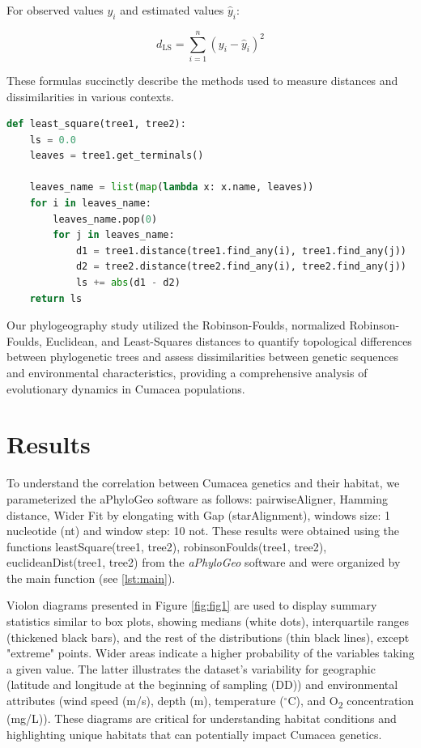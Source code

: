 For observed values $y_i$ and estimated values $\hat{y}_i$:

\begin{equation}\label{eq:ls}
    d_{\text{LS}} = \sum_{i=1}^{n} (y_i - \hat{y}_i)^2
\end{equation}

These formulas succinctly describe the methods used to measure distances and dissimilarities in various contexts.

\begin{lstlisting}[label=lst:LeastSquare, language=Python, caption=Python script for calculating the Least-Square distance using the ete3 package in the aPhyloGeo package]
def least_square(tree1, tree2):
    ls = 0.0
    leaves = tree1.get_terminals()

    leaves_name = list(map(lambda x: x.name, leaves))
    for i in leaves_name:
        leaves_name.pop(0)
        for j in leaves_name:
            d1 = tree1.distance(tree1.find_any(i), tree1.find_any(j))
            d2 = tree2.distance(tree2.find_any(i), tree2.find_any(j))
            ls += abs(d1 - d2)
    return ls
\end{lstlisting}

Our phylogeography study utilized the Robinson-Foulds, normalized Robinson-Foulds, Euclidean, and Least-Squares distances to quantify topological differences between phylogenetic trees and assess dissimilarities between genetic sequences and environmental characteristics, providing a comprehensive analysis of evolutionary dynamics in Cumacea populations.

\section{Results}\label{results}

To understand the correlation between Cumacea genetics and their habitat, we parameterized the aPhyloGeo software as follows: pairwiseAligner, Hamming distance, Wider Fit by elongating with Gap (starAlignment), windows size: 1 nucleotide (nt) and window step: 10 not. These results were obtained using the functions leastSquare(tree1, tree2), robinsonFoulds(tree1, tree2), euclideanDist(tree1, tree2) from the \textit{aPhyloGeo} software and were organized by the main function (see \autoref{lst:main}). 

Violon diagrams presented in Figure \ref{fig:fig1} are used to display summary statistics similar to box plots, showing medians (white dots), interquartile ranges (thickened black bars), and the rest of the distributions (thin black lines), except "extreme" points. Wider areas indicate a higher probability of the variables taking a given value. The latter illustrates the dataset’s variability for geographic (latitude and longitude at the beginning of sampling (DD)) and environmental attributes (wind speed (m/s), depth (m), temperature ($^\circ$C), and O\textsubscript{2} concentration (mg/L)). These diagrams are critical for understanding habitat conditions and highlighting unique habitats that can potentially impact Cumacea genetics. 

